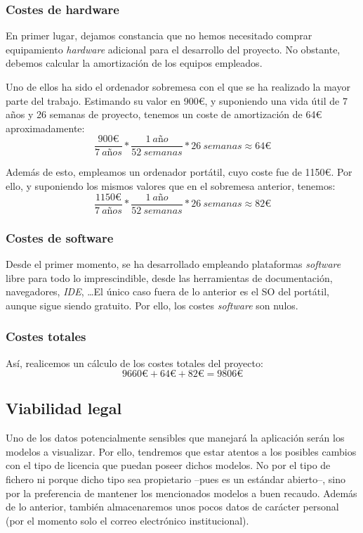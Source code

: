 \subsubsection{Costes de hardware}
En primer lugar, dejamos constancia que no hemos necesitado comprar equipamiento \textit{hardware} adicional para el desarrollo del proyecto. No obstante, debemos calcular la amortización de los equipos empleados.

Uno de ellos ha sido el ordenador sobremesa con el que se ha realizado la mayor parte del trabajo. Estimando su valor en 900\euro, y suponiendo una vida útil de 7 años y 26 semanas de proyecto, tenemos un coste de amortización de 64\euro{} aproximadamente:
\[ \frac{900\euro}{7 \ a\textit{ñ}os} * \frac{1 \ a\textit{ñ}o}{52 \ semanas} * 26 \ semanas \approx 64\euro \]

Además de esto, empleamos un ordenador portátil, cuyo coste fue de 1150\euro. Por ello, y suponiendo los mismos valores que en el sobremesa anterior, tenemos:
\[ \frac{1150\euro}{7 \ a\textit{ñ}os} * \frac{1 \ a\textit{ñ}o}{52 \ semanas} * 26 \ semanas \approx 82\euro \]

\subsubsection{Costes de software}
Desde el primer momento, se ha desarrollado empleando plataformas \textit{software} libre para todo lo imprescindible, desde las herramientas de documentación, navegadores, \textit{IDE}, \dots \space El único caso fuera de lo anterior es el SO del portátil, aunque sigue siendo gratuito. Por ello, los costes \textit{software} son nulos.

\subsubsection{Costes totales}
\noindent Así, realicemos un cálculo de los costes totales del proyecto:
\[ 9660\euro + 64\euro + 82\euro = 9806\euro \]

\subsection{Viabilidad legal}
Uno de los datos potencialmente sensibles que manejará la aplicación serán los modelos a visualizar. Por ello, tendremos que estar atentos a los posibles cambios con el tipo de licencia que puedan poseer dichos modelos. No por el tipo de fichero ni porque dicho tipo sea propietario --pues es un estándar abierto--, sino por la preferencia de mantener los mencionados modelos a buen recaudo.
Además de lo anterior, también almacenaremos unos pocos datos de carácter personal (por el momento solo el correo electrónico institucional).


